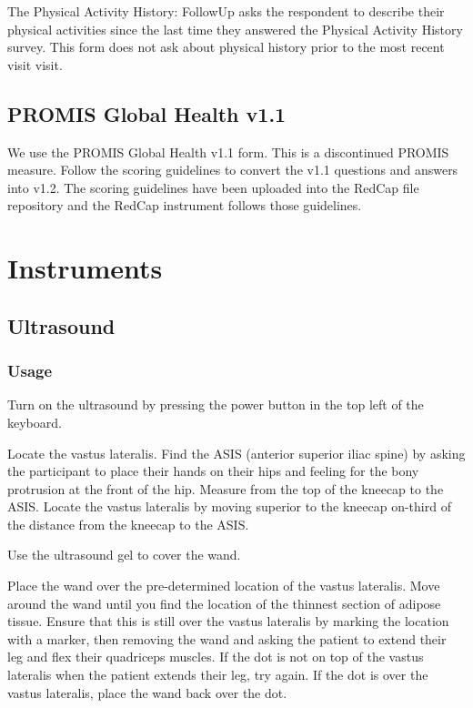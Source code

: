 \documentclass[
]{book}
\begin{document}
The Physical Activity History: FollowUp asks the respondent to describe their physical activities since the last time they answered the Physical Activity History survey. This form does not ask about physical history prior to the most recent visit visit.

\hypertarget{Appendix-Surveys-promis}{%
\section{PROMIS Global Health v1.1}\label{Appendix-Surveys-promis}}

We use the PROMIS Global Health v1.1 form. This is a discontinued PROMIS measure. Follow the scoring guidelines to convert the v1.1 questions and answers into v1.2. The scoring guidelines have been uploaded into the RedCap file repository and the RedCap instrument follows those guidelines.

\hypertarget{Instruments}{%
\chapter{Instruments}\label{Instruments}}

\hypertarget{Appendix-Instruments-Ultrasound}{%
\section{Ultrasound}\label{Appendix-Instruments-Ultrasound}}

\hypertarget{Appendix-Instruments-Ultrasound-Usage}{%
\subsection{Usage}\label{Appendix-Instruments-Ultrasound-Usage}}

Turn on the ultrasound by pressing the power button in the top left of the keyboard.

Locate the vastus lateralis. Find the ASIS (anterior superior iliac spine) by asking the participant to place their hands on their hips and feeling for the bony protrusion at the front of the hip. Measure from the top of the kneecap to the ASIS. Locate the vastus lateralis by moving superior to the kneecap on-third of the distance from the kneecap to the ASIS.

Use the ultrasound gel to cover the wand.

Place the wand over the pre-determined location of the vastus lateralis. Move around the wand until you find the location of the thinnest section of adipose tissue. Ensure that this is still over the vastus lateralis by marking the location with a marker, then removing the wand and asking the patient to extend their leg and flex their quadriceps muscles. If the dot is not on top of the vastus lateralis when the patient extends their leg, try again. If the dot is over the vastus lateralis, place the wand back over the dot.
\end{document}

